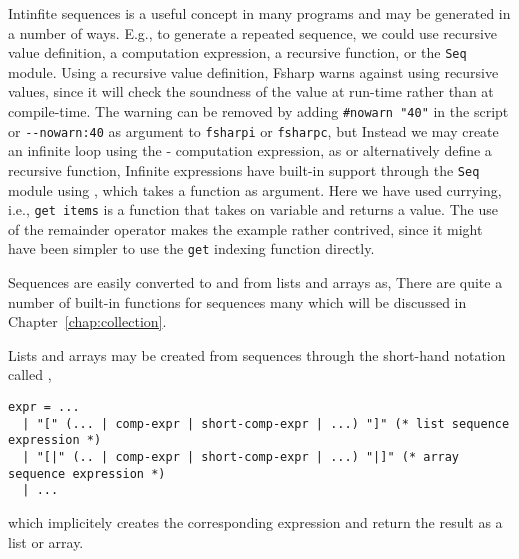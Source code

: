 Intinfite sequences is a useful concept in many programs and may be generated in a number of ways. E.g., to generate a repeated sequence, we could use recursive value definition, a computation expression, a recursive function, or the \lstinline!Seq! module. Using a recursive value definition,
%
%
Fsharp warns against using recursive values, since it will check the soundness of the value at run-time rather than at compile-time. The warning can be removed by adding \lstinline!#nowarn "40"! in the script or \lstinline!--nowarn:40! as argument to \lstinline[language=console]!fsharpi! or \lstinline[language=console]!fsharpc!, but  Instead we may create an infinite loop using the - computation expression, as
%
%
or alternatively define a recursive function,
%
%
Infinite expressions have built-in support through the \lstinline!Seq! module using ,
%
%
which takes a function as argument. Here we have used currying, i.e., \lstinline!get items! is a function that takes on variable and returns a value. The use of the remainder operator makes the example rather contrived, since it might have been simpler to use the \lstinline!get! indexing function directly.

Sequences are easily converted to and from lists and arrays as,
%
%
There are quite a number of built-in functions for sequences many which will be discussed in Chapter~\ref{chap:collection}.
 
Lists and arrays may be created from sequences through the short-hand notation called ,
\begin{lstlisting}[language=ebnf]
expr = ... 
  | "[" (... | comp-expr | short-comp-expr | ...) "]" (* list sequence expression *)
  | "[|" (.. | comp-expr | short-comp-expr | ...) "|]" (* array sequence expression *)
  | ...
\end{lstlisting}
which implicitely creates the corresponding expression and return the result as a list or array.

